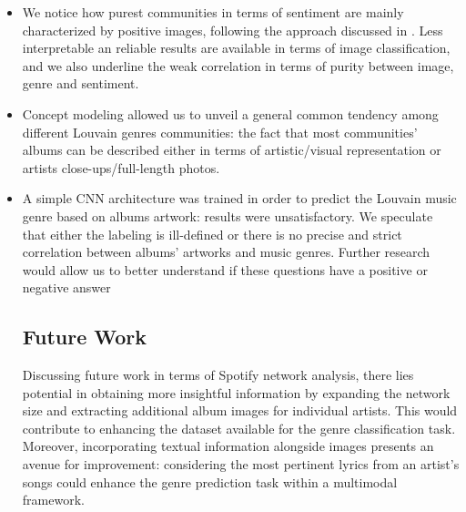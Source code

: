 \documentclass[sigchi]{acmart}
\begin{document}
\begin{itemize}
    
\item We notice how purest communities in terms of sentiment are mainly characterized by positive images, following the approach discussed in \cite{Vadicamo_2017_ICCV}. Less interpretable an reliable results are available in terms of image classification, and we also underline the weak correlation in terms of purity between image, genre and sentiment.

\item Concept modeling allowed us to unveil a general common tendency among different Louvain genres communities: the fact that most communities' albums can be described either in terms of artistic/visual representation or artists close-ups/full-length photos. 

\item A simple CNN architecture was trained in order to predict the Louvain music genre based on albums artwork: results were unsatisfactory. We speculate that either the labeling is ill-defined or there is no precise and strict correlation between albums' artworks and music genres. Further research would allow us to better understand if these questions have a positive or negative answer

\subsection{Future Work}
Discussing future work in terms of Spotify network analysis, there lies potential in obtaining more insightful information by expanding the network size and extracting additional album images for individual artists. This would contribute to enhancing the dataset available for the genre classification task. Moreover, incorporating textual information alongside images presents an avenue for improvement: considering the most pertinent lyrics from an artist's songs could enhance the genre prediction task within a multimodal framework.

\end{itemize}




\end{document}
